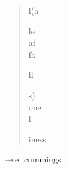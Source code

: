 \documentclass[fleqn,addpoints]{exam}
\begin{document}
\ifprintanswers


\fi

\ifprintanswers
\else
\vspace{3 cm}

\begin{ttfamily}
\begin{verse}
l(a

le \\
af \\
fa 

ll 

s) \\
one \\
l 

iness
\end{verse}

\vspace{.1 cm}
\hspace{1 cm} --e.e. cummings

\end{ttfamily}

\fi
\end{document}

